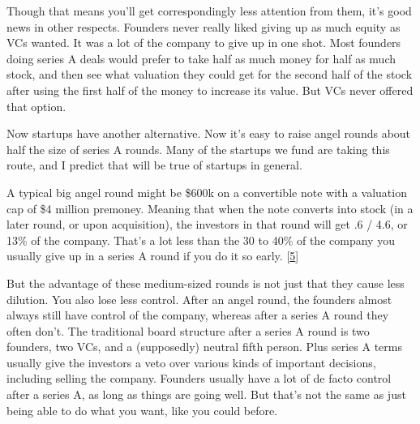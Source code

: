 Though that means you'll get
                    correspondingly less attention from them, it's good news in
                    other respects. Founders never really liked giving up as
                    much equity as VCs wanted. It was a lot of the company to
                    give up in one shot. Most founders doing series A deals
                    would prefer to take half as much money for half as much
                    stock, and then see what valuation they could get for the
                    second half of the stock after using the first half of the
                    money to increase its value. But VCs never offered that
                    option.

Now startups have another alternative.
                    Now it's easy to raise angel rounds about half the size of
                    series A rounds. Many of the startups we fund are taking
                    this route, and I predict that will be true of startups in
                    general.

A typical big angel round might be \$600k
                    on a convertible note with a valuation cap of \$4 million
                    premoney. Meaning that when the note converts into stock (in
                    a later round, or upon acquisition), the investors in that
                    round will get .6 / 4.6, or 13\% of the company. That's a lot
                    less than the 30 to 40\% of the company you usually give up
                    in a series A round if you do it so early.
                    [\href{\#f5n}{5}]

But the advantage of these medium-sized rounds
                    is not just that they cause less dilution. You also lose
                    less control. After an angel round, the founders almost
                    always still have control of the company, whereas after a
                    series A round they often don't. The traditional board
                    structure after a series A round is two founders, two VCs,
                    and a (supposedly) neutral fifth person. Plus series A terms
                    usually give the investors a veto over various kinds of
                    important decisions, including selling the company. Founders
                    usually have a lot of de facto control after a series A, as
                    long as things are going well. But that's not the same as
                    just being able to do what you want, like you could
                    before.

